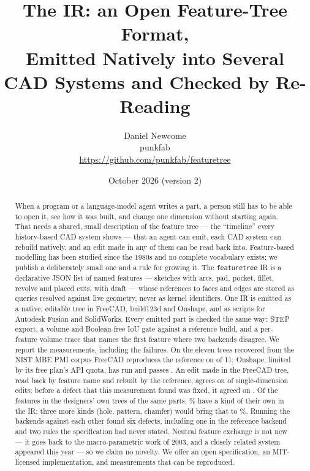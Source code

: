 \documentclass[11pt]{article}
\title{\textbf{The \code{featuretree} IR: an Open Feature-Tree Format,\\
Emitted Natively into Several CAD Systems and Checked by Re-Reading}}
\author{Daniel Newcome\\[2pt]
  \small punkfab\\
  \small\url{https://github.com/punkfab/featuretree}}
\date{October 2026 (version 2)}
\newcommand{\code}[1]{\texttt{\small #1}}
\begin{document}
\maketitle

\begin{abstract}
When a program or a language-model agent writes a part, a person still has to be
able to open it, see how it was built, and change one dimension without starting
again. That needs a shared, small description of the feature tree --- the
``timeline'' every history-based CAD system shows --- that an agent can emit, each
CAD system can rebuild natively, and an edit made in any of them can be read
back into. Feature-based modelling has been studied since the 1980s and no
complete vocabulary exists; we publish a deliberately small one and a rule for
growing it. The \code{featuretree} IR is a declarative JSON list of named
features --- sketches with arcs, pad, pocket, fillet, revolve and placed cuts,
with draft --- whose references to faces and edges are stored as queries resolved
against live geometry, never as kernel identifiers. One IR is emitted as a
native, editable tree in FreeCAD, build123d and Onshape, and as scripts for
Autodesk Fusion and SolidWorks. Every emitted part is checked the same way: STEP
export, a volume and Boolean-free IoU gate against a reference build, and a
per-feature volume trace that names the first feature where two backends
disagree. We report the measurements, including the failures. On the eleven
trees recovered from the NIST MBE PMI corpus FreeCAD reproduces the reference on
\FCverified{} of 11; Onshape, limited by its free plan's API quota, has run
\OSrun{} and passes \OSverified{}. An edit made in the FreeCAD tree, read back by
feature name and rebuilt by the reference, agrees on \NudgeAgree{} of
\NudgeTried{} single-dimension edits; before a defect that this measurement found
was fixed, it agreed on \NudgeBeforeAgree{}. Of the \VocabTotal{} features in the
designers' own trees of the same parts, \VocabKindPct\% have a kind of their own in
the IR; three more kinds (hole, pattern, chamfer) would bring that to
\VocabNextPct\%. Running the backends against each other found six defects,
including one in the reference backend and two rules the specification had never
stated. Neutral feature exchange is not new --- it goes back to the
macro-parametric work of 2003, and a closely related system appeared this year
--- so we claim no novelty. We offer an open specification, an MIT-licensed
implementation, and measurements that can be reproduced.
\end{abstract}
\end{document}
